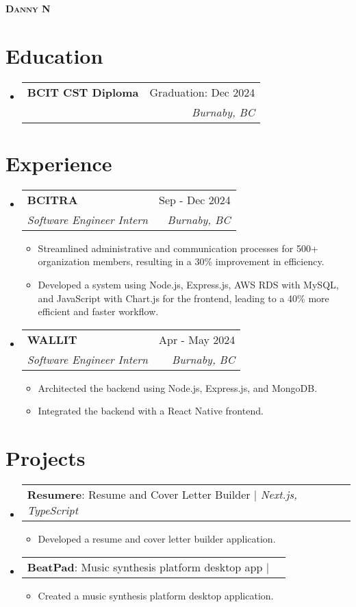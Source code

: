 \documentclass[letterpaper,11pt]{article}
\makeatletter
\newcommand{\resumeItem}[1]{
\item\small{
{#1 \vspace{-2pt}}
}
}
\newcommand{\resumeSubheading}[4]{
\vspace{-2pt}\item
\begin{tabular*}{0.97\textwidth}[t]{l@{\extracolsep{\fill}}r}
\textbf{#1} & #2 \\
\textit{\small#3} & \textit{\small #4} \\
\end{tabular*}\vspace{-7pt}
}
\newcommand{\resumeProjectHeading}[2]{
\item
\begin{tabular*}{0.97\textwidth}{l@{\extracolsep{\fill}}r}
\small#1 & #2 \\
\end{tabular*}\vspace{-7pt}
}
\newcommand{\resumeSubHeadingListStart}{\begin{itemize}[leftmargin=0.15in, label={}]}
\newcommand{\resumeSubHeadingListEnd}{\end{itemize}}
\newcommand{\resumeItemListStart}{\begin{itemize}}
\newcommand{\resumeItemListEnd}{\end{itemize}\vspace{-5pt}}
\makeatother
\begin{document}
\begin{center}
\textbf{\Huge \scshape Danny N} \\ \vspace{1pt}
\end{center}


\section{Education}
\resumeSubHeadingListStart
\resumeSubheading{BCIT CST Diploma}{Graduation: Dec 2024}{}{Burnaby, BC}
\resumeSubHeadingListEnd

\section{Experience}
\resumeSubHeadingListStart
\resumeSubheading{BCITRA}{Sep - Dec 2024}{Software Engineer Intern}{Burnaby, BC}
\resumeItemListStart
\resumeItem{Streamlined administrative and communication processes for 500+ organization members, resulting in a 30\% improvement in efficiency.}
\resumeItem{Developed a system using Node.js, Express.js, AWS RDS with MySQL, and JavaScript with Chart.js for the frontend, leading to a 40\% more efficient and faster workflow.}
\resumeItemListEnd

\resumeSubheading{WALLIT}{Apr - May 2024}{Software Engineer Intern}{Burnaby, BC}
\resumeItemListStart
\resumeItem{Architected the backend using Node.js, Express.js, and MongoDB.}
\resumeItem{Integrated the backend with a React Native frontend.}
\resumeItemListEnd
\resumeSubHeadingListEnd

\section{Projects}
\resumeSubHeadingListStart
\resumeProjectHeading{\textbf{Resumere}: Resume and Cover Letter Builder $|$ \emph{Next.js, TypeScript}}{}
\resumeItemListStart
\resumeItem{Developed a resume and cover letter builder application.}
\resumeItemListEnd

\resumeProjectHeading{\textbf{BeatPad}: Music synthesis platform desktop app $|$ \emph{}}{}
\resumeItemListStart
\resumeItem{Created a music synthesis platform desktop application.}
\resumeItemListEnd
\resumeSubHeadingListEnd
\end{document}
